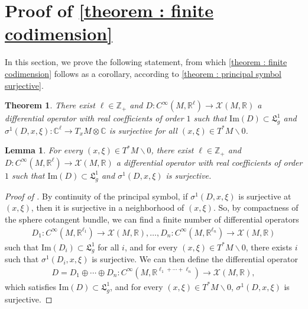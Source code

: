 \documentclass[10pt]{article}
\newcommand{\C}{{\mathbb C}}
\newcommand{\R}{{\mathbb R}}
\newcommand{\Z}{{\mathbb Z}}
\newcommand{\Chi}{{\mathcal X}}
\newcommand{\LL}{{\mathfrak L}}
\newtheorem{theorem}{Theorem}
\newtheorem{lemma}{Lemma}
\begin{document}
\section{Proof of \cref{theorem : finite codimension}}\label{sec:core}

In this section, we prove the following statement, from which \cref{theorem : finite codimension} follows as a corollary, according to \cref{theorem : principal symbol surjective}.

\begin{theorem}\label{theorem : elliptic construction}
    There exist $\ell \in \Z_+$ and $D: C^\infty(M,\R^\ell)\rightarrow \Chi(M,\R)$ a differential operator with real coefficients of order $1$ such that $\mathrm{Im}(D)\subset \LL_g^1$ and $\sigma^1(D,x,\xi):\C^\ell\to T_xM\otimes \C$ is surjective for all $(x,\xi)\in T^*M\backslash 0$.
\end{theorem}
\begin{lemma}\label{lem : symbol at point}
    For every $(x,\xi)\in T^*M\backslash 0$, there exist $\ell \in \Z_+$ and $D: C^\infty(M,\R^\ell)\rightarrow \Chi(M,\R)$ a differential operator with real coefficients of order $1$ such that $\mathrm{Im}(D)\subset \LL_g^1$ and $\sigma^1(D,x,\xi)$ is surjective.
\end{lemma}
\begin{proof}[Proof of ]
    By continuity of the principal symbol, if $\sigma^1(D,x,\xi)$ is surjective at $(x,\xi)$, then it is surjective in a neighborhood of $(x,\xi)$.
    So, by compactness of the sphere cotangent bundle, we can find a finite number of differential operators
    \begin{equation*}\begin{aligned}
            D_{1}: C^\infty(M,\R^{\ell_1})\rightarrow \Chi(M,\R),\dots, D_{n}: C^\infty(M,\R^{\ell_n})\rightarrow \Chi(M,\R)
        \end{aligned}\end{equation*}
    such that $\mathrm{Im}(D_{i})\subset \LL_g^1$ for all $i$, and for every $(x,\xi)\in T^*M\backslash 0$, there exists $i$ such that $\sigma^1(D_{i},x,\xi)$ is surjective.
    We can then define
    the differential operator
    \begin{equation*}\begin{aligned}
            D=D_1\oplus \cdots\oplus D_n:C^\infty(M,\R^{\ell_1+\cdots+\ell_n})\rightarrow \Chi(M,\R),
        \end{aligned}\end{equation*}
    which satisfies
    $\mathrm{Im}(D)\subset \LL_g^1$, and for every $(x,\xi)\in T^*M\backslash 0$, $\sigma^1(D,x,\xi)$ is surjective.
\end{proof}
\end{document}
